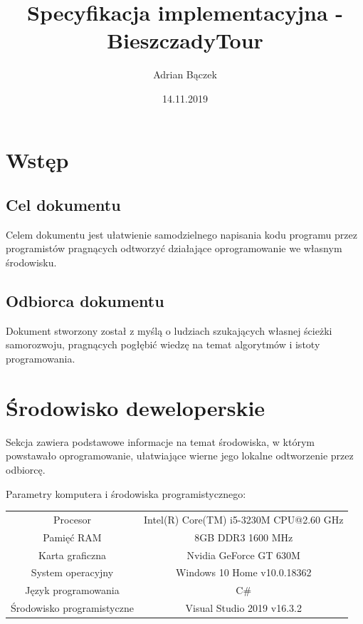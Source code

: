 \documentclass[10pt,oneside]{article}
\title{Specyfikacja implementacyjna - BieszczadyTour}
\author{Adrian Bączek}
\date{14.11.2019}
\begin{document}
\maketitle


\thispagestyle{fancy}

\newpage


\tableofcontents

\newpage

\section{Wstęp}
\subsection{Cel dokumentu}
Celem dokumentu jest ułatwienie samodzielnego napisania kodu programu przez programistów pragnących odtworzyć działające oprogramowanie we własnym środowisku.
\subsection{Odbiorca dokumentu}
Dokument stworzony został z myślą o ludziach szukających własnej ścieżki samorozwoju, pragnących pogłębić wiedzę na temat algorytmów i istoty programowania. 

\section{Środowisko deweloperskie}
Sekcja zawiera podstawowe informacje na temat środowiska, w którym powstawało oprogramowanie, ułatwiające wierne jego lokalne odtworzenie przez odbiorcę.
\begin{center}
Parametry komputera i środowiska programistycznego:
\newline \newline
\begin{tabular}{|c|c|} \hline
	Procesor & Intel(R) Core(TM) i5-3230M CPU@2.60 GHz
	\\[10pt] Pamięć RAM & 8GB DDR3 1600 MHz
	\\[10pt] Karta graficzna & Nvidia GeForce GT 630M
	\\[10pt] System operacyjny & Windows 10 Home v10.0.18362
	\\[10pt] Język programowania & C\#
	\\[10pt] Środowisko programistyczne & Visual Studio 2019 v16.3.2 \\ \hline
\end{tabular}
\end{center}
\end{document}
